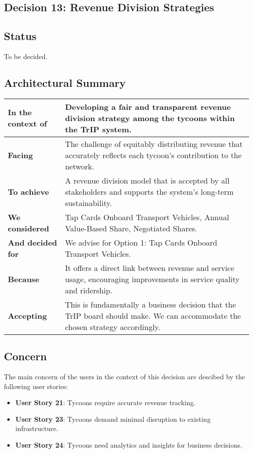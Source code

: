 \subsection{Decision 13: Revenue Division Strategies}

\subsection*{Status}
To be decided.

\subsection*{Architectural Summary}
\begin{tabular}{|p{3.5cm}|p{10.5cm}|}
    \hline
    \textbf{In the context of} & Developing a fair and transparent revenue division strategy among the tycoons within the TrIP system. \\
    \hline
    \textbf{Facing} & The challenge of equitably distributing revenue that accurately reflects each tycoon's contribution to the network. \\
    \hline
    \textbf{To achieve} & A revenue division model that is accepted by all stakeholders and supports the system's long-term sustainability. \\
    \hline
    \textbf{We considered} & Tap Cards Onboard Transport Vehicles, Annual Value-Based Share, Negotiated Shares. \\
    \hline
    \textbf{And decided for} & We advise for Option 1: Tap Cards Onboard Transport Vehicles. \\
    \hline
    \textbf{Because} & It offers a direct link between revenue and service usage, encouraging improvements in service quality and ridership. \\
    \hline
    \textbf{Accepting} & This is fundamentally a business decision that the TrIP board should make. We can accommodate the chosen strategy accordingly. \\
    \hline
\end{tabular}

\subsection*{Concern}
The main concern of the users in the context of this decision are descibed by the following user stories: 
\begin{itemize}
    \item \textbf{User Story 21}: Tycoons require accurate revenue tracking.
    \item \textbf{User Story 23}: Tycoons demand minimal disruption to existing infrastructure.
    \item \textbf{User Story 24}: Tycoons need analytics and insights for business decisions.
\end{itemize}

